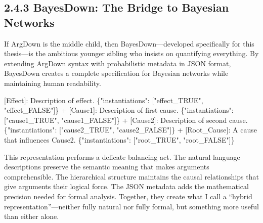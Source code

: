 \documentclass[
  11pt,
  letterpaper,
  openany]{book}
\newenvironment{Shaded}{\begin{snugshade}}{\end{snugshade}}
\newcommand{\DataTypeTok}[1]{\textcolor[rgb]{0.68,0.00,0.00}{#1}}
\newcommand{\ErrorTok}[1]{\textcolor[rgb]{0.68,0.00,0.00}{#1}}
\newcommand{\FunctionTok}[1]{\textcolor[rgb]{0.28,0.35,0.67}{#1}}
\newcommand{\OtherTok}[1]{\textcolor[rgb]{0.00,0.23,0.31}{#1}}
\newcommand{\StringTok}[1]{\textcolor[rgb]{0.13,0.47,0.30}{#1}}
\begin{document}
\subsection{2.4.3 BayesDown: The Bridge to Bayesian
Networks}\label{sec-bayesdown}

If ArgDown is the middle child, then BayesDown---developed specifically
for this thesis---is the ambitious younger sibling who insists on
quantifying everything. By extending ArgDown syntax with probabilistic
metadata in JSON format, BayesDown creates a complete specification for
Bayesian networks while maintaining human readability.

\begin{Shaded}
\begin{Highlighting}[]
\OtherTok{[}\ErrorTok{Effect}\OtherTok{]}\ErrorTok{:} \ErrorTok{Description} \ErrorTok{of} \ErrorTok{effect.} \FunctionTok{\{}\DataTypeTok{"instantiations"}\FunctionTok{:} \OtherTok{[}\StringTok{"effect\_TRUE"}\OtherTok{,} \StringTok{"effect\_FALSE"}\OtherTok{]}\FunctionTok{\}}
 \ErrorTok{+} \OtherTok{[}\ErrorTok{Cause1}\OtherTok{]}\ErrorTok{:} \ErrorTok{Description} \ErrorTok{of} \ErrorTok{first} \ErrorTok{cause.} \FunctionTok{\{}\DataTypeTok{"instantiations"}\FunctionTok{:} \OtherTok{[}\StringTok{"cause1\_TRUE"}\OtherTok{,} \StringTok{"cause1\_FALSE"}\OtherTok{]}\FunctionTok{\}}
 \ErrorTok{+} \OtherTok{[}\ErrorTok{Cause2}\OtherTok{]}\ErrorTok{:} \ErrorTok{Description} \ErrorTok{of} \ErrorTok{second} \ErrorTok{cause.} \FunctionTok{\{}\DataTypeTok{"instantiations"}\FunctionTok{:} \OtherTok{[}\StringTok{"cause2\_TRUE"}\OtherTok{,} \StringTok{"cause2\_FALSE"}\OtherTok{]}\FunctionTok{\}}
   \ErrorTok{+} \OtherTok{[}\ErrorTok{Root\_Cause}\OtherTok{]}\ErrorTok{:} \ErrorTok{A} \ErrorTok{cause} \ErrorTok{that} \ErrorTok{influences} \ErrorTok{Cause2.} \FunctionTok{\{}\DataTypeTok{"instantiations"}\FunctionTok{:} \OtherTok{[}\StringTok{"root\_TRUE"}\OtherTok{,} \StringTok{"root\_FALSE"}\OtherTok{]}\FunctionTok{\}}
\end{Highlighting}
\end{Shaded}

This representation performs a delicate balancing act. The natural
language descriptions preserve the semantic meaning that makes arguments
comprehensible. The hierarchical structure maintains the causal
relationships that give arguments their logical force. The JSON metadata
adds the mathematical precision needed for formal analysis. Together,
they create what I call a ``hybrid representation''---neither fully
natural nor fully formal, but something more useful than either alone.
\end{document}
